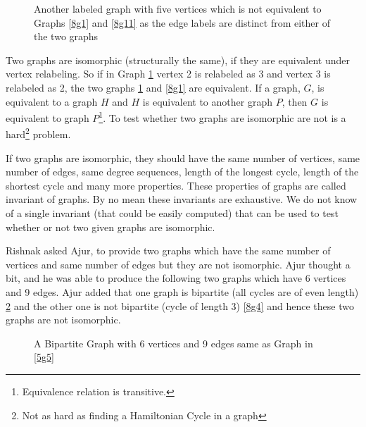 \begin{figure}
\begin{center}
\caption{ Another labeled graph with five vertices which is not equivalent to Graphs \ref{8g1} and \ref{8g11} as the edge labels are distinct from either of the two graphs}\label{8g2}
\end{center}
\end{figure}

Two graphs are isomorphic (structurally the same), if they are equivalent under vertex relabeling. So if in Graph \ref{8g2} vertex 2 is relabeled as 3 and vertex 3 is relabeled as 2, the two graphs \ref{8g2} and \ref{8g1} are equivalent. If a graph, $G$, is equivalent to a graph $H$ and $H$ is equivalent to another graph $P$, then $G$ is equivalent to graph $P$\footnote{Equivalence relation is transitive.}. To test whether two graphs are isomorphic are not is a hard\footnote{Not as hard as finding a Hamiltonian Cycle in a graph} problem.

If two graphs are isomorphic, they should have the same number of vertices, same number of edges, same degree sequences, length of the longest cycle, length of the shortest cycle and many more properties.  These properties of graphs are called invariant of graphs. By no mean these invariants are exhaustive. We do not know of a single invariant (that could be easily computed) that can be used to test whether or not two given graphs are isomorphic. 

Rishnak asked Ajur, to provide two graphs which have the same number of vertices and same number of edges but they are not isomorphic. Ajur thought a bit, and he was able to produce the following two graphs which have 6 vertices and 9 edges. Ajur added that one graph is bipartite (all cycles are of even length) \ref{8g3} and the other one is not bipartite (cycle of length 3) \ref{8g4} and hence these two graphs are not isomorphic.

\begin{figure}

\caption{ A Bipartite Graph with 6 vertices and 9 edges same as Graph in \ref{5g5}}\label{8g3}

\end{figure}

